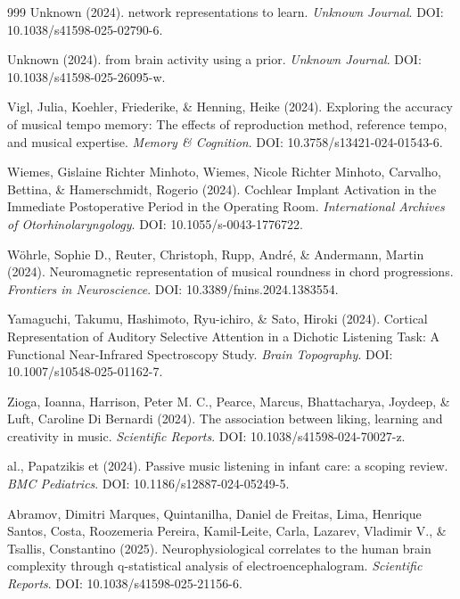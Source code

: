 \documentclass[9pt,onecolumn]{article}
\begin{document}
\begin{thebibliography}{999}
Unknown (2024). network representations to learn. \textit{Unknown Journal}. DOI: 10.1038/s41598-025-02790-6.

Unknown (2024). from brain activity using a prior. \textit{Unknown Journal}. DOI: 10.1038/s41598-025-26095-w.

Vigl, Julia, Koehler, Friederike, \& Henning, Heike (2024). Exploring the accuracy of musical tempo memory: The effects of reproduction method, reference tempo, and musical expertise. \textit{Memory \& Cognition}. DOI: 10.3758/s13421-024-01543-6.

Wiemes, Gislaine Richter Minhoto, Wiemes, Nicole Richter Minhoto, Carvalho, Bettina, \& Hamerschmidt, Rogerio (2024). Cochlear Implant Activation in the Immediate Postoperative Period in the Operating Room. \textit{International Archives of Otorhinolaryngology}. DOI: 10.1055/s-0043-1776722.

Wöhrle, Sophie D., Reuter, Christoph, Rupp, André, \& Andermann, Martin (2024). Neuromagnetic representation of musical roundness in chord progressions. \textit{Frontiers in Neuroscience}. DOI: 10.3389/fnins.2024.1383554.

Yamaguchi, Takumu, Hashimoto, Ryu-ichiro, \& Sato, Hiroki (2024). Cortical Representation of Auditory Selective Attention in a Dichotic Listening Task: A Functional Near-Infrared Spectroscopy Study. \textit{Brain Topography}. DOI: 10.1007/s10548-025-01162-7.

Zioga, Ioanna, Harrison, Peter M. C., Pearce, Marcus, Bhattacharya, Joydeep, \& Luft, Caroline Di Bernardi (2024). The association between liking, learning and creativity in music. \textit{Scientific Reports}. DOI: 10.1038/s41598-024-70027-z.

al., Papatzikis et (2024). Passive music listening in infant care: a scoping review. \textit{BMC Pediatrics}. DOI: 10.1186/s12887-024-05249-5.

Abramov, Dimitri Marques, Quintanilha, Daniel de Freitas, Lima, Henrique Santos, Costa, Roozemeria Pereira, Kamil-Leite, Carla, Lazarev, Vladimir V., \& Tsallis, Constantino (2025). Neurophysiological correlates to the human brain complexity through q-statistical analysis of electroencephalogram. \textit{Scientific Reports}. DOI: 10.1038/s41598-025-21156-6.


\end{thebibliography}
\end{document}
